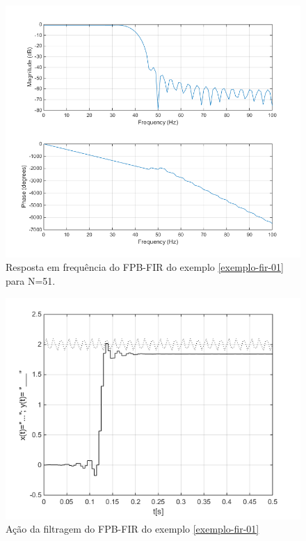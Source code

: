 		\begin{figure}[!ht]
			\label{fig01-exemplo-fir}
			\centering
			\includegraphics[scale=0.5]{./figuras/simulacoes/resp-freq-fir-exemplo.png}
			\caption{Resposta em frequência do FPB-FIR do exemplo \ref{exemplo-fir-01} para N=51.}
		\end{figure}
		
		\begin{figure}[!ht]
			\label{fig02-exemplo-fir}
			\centering
			\includegraphics[scale=0.5]{./figuras/simulacoes/acao-filtragem-fir-exemplo.png}
			\caption{Ação da filtragem do FPB-FIR do exemplo \ref{exemplo-fir-01}}
		\end{figure}
		
